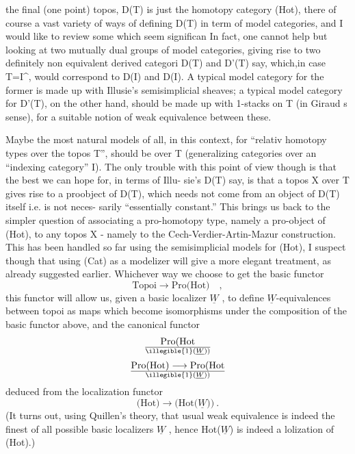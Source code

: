 the final (one point) topos,  D(T) is just the homotopy category
(Hot), there   of course a vast variety of ways of defining D(T) in term
of model categories, and I would like to review some which seem significan
In fact, one cannot help but looking at two mutually dual groups of model
categories, giving rise to  two definitely non equivalent derived categori
D(T) and D'(T) say, which,in case T=I\^{}, would correspond to D(I) and
D(I). A typical model category for the former  is made up with
Illusie's semisimplicial sheaves; a typical model category for 
D'(T), on the other hand, should be made up with 1-stacks on T (in Giraud
s sense), for a suitable notion of weak equivalence between these.

Maybe the most natural models of all, in this context, for ``relativ
homotopy types over the topos T'', should be \uline{}  over T (generalizing 
categories over an ``indexing category'' I). The only trouble with this
point of view though is that the best we can hope for, in terms of Illu-%
sie's D(T) say, is that a topos X over T gives rise to a proobject of
D(T), which needs not come from an object of D(T) itself i.e. is not neces-%
sarily  ``essentially constant.'' This brings us back to the simpler
 question of associating a pro-homotopy type, namely a pro-object of (Hot),
to any topos X - namely  to the \hand{\v{ }}Cech-Verdier-Artin-Mazur construction.
This has been handled so far using the semisimplicial models for (Hot),
I suspect though that using (Cat) as a modelizer will give a more elegant
treatment, as already suggested earlier. Whichever way we choose to get
the basic functor
\[ \text{Topoi} \longrightarrow \text{Pro(Hot)} \quad , \]
this functor will allow us, given a basic localizer $\underline{W}$ , to define
$\underline{W}$-equivalences between topoi\hand{\unsure{,}} as maps  which become isomorphisms
under the composition of the basic functor above, and the canonical
functor
\[ \text{Pro(Hot}\over{\illegible{1}}{(}\underline{W})) \]
\[ \text{Pro(Hot)} \longrightarrow \text{Pro(Hot}\over{\illegible{1}}{(}\underline{W})) \]
deduced from the localization functor 
\[ \text{(Hot)} \longrightarrow \text{(Hot(}\underline{W})) \ . \]
(It turns out, using Quillen's theory, that usual weak equivalence is
indeed the finest of all possible basic localizers $\underline{W}$ , hence Hot($\underline{W}$) is
indeed a lolization of (Hot).)


